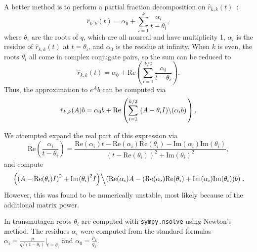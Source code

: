 A better method is to perform a partial fraction decomposition on $\hat{r}_{k,
  k}(t)$~\cite{pusa2010computing}:
\begin{equation}
\label{eq:part-frac}
  \hat{r}_{k, k}(t) = \alpha_0 + \sum_{i=1}^k \frac{\alpha_i}{t - \theta_i},
\end{equation}
where $\theta_i$ are the roots of $q$, which are all
nonreal and have multiplicity 1, $\alpha_i$ is the residue of
$\hat{r}_{k, k}(t)$ at $t=\theta_i$, and $\alpha_0$ is the residue at
infinity. When $k$ is even, the roots $\theta_i$ all come in complex conjugate
pairs, so the sum can be reduced to
\begin{equation}
  \hat{r}_{k, k}(t) = \alpha_0 + \mathrm{Re}\left(\sum_{i=1}^{k/2}
    \frac{\alpha_i}{t - \theta_i}\right).
\end{equation}
Thus, the approximation to $e^Ab$ can be computed via
\begin{equation}
\label{eq:part-frac-matrix-re}
  \hat{r}_{k, k}(A)b = \alpha_0b + \mathrm{Re}\left(\sum_{i=1}^{k/2} \left. (A -
    \theta_i I)\middle\backslash(\alpha_i b) \right.\right).
\end{equation}

We attempted expand the real part of this expression via
\begin{equation}
\mathrm{Re}\left(\frac{\alpha_i}{t - \theta_i}\right) = \frac{\mathrm{Re}{(\alpha_{i})}t - \mathrm{Re}{(\alpha_{i})} \mathrm{Re}{(\theta_{i})} - \mathrm{Im}{(\alpha_{i})} \mathrm{Im}{(\theta_{i})}}{\left(t - \mathrm{Re}{(\theta_{i})}\right)^{2} + \mathrm{Im}{(\theta_{i})}^{2}},
\end{equation}
and compute
\begin{equation}
  \left.\left(\left(A - \mathrm{Re}{(\theta_{i})I}\right)^{2} +
  \mathrm{Im}{(\theta_{i})}^{2}I\right)\middle\backslash \left(\mathrm{Re}{(\alpha_{i})}A - (\mathrm{Re}{(\alpha_{i})} \mathrm{Re}{(\theta_{i})} + \mathrm{Im}{(\alpha_{i})} \mathrm{Im}{(\theta_{i})})b\right)\right..
\end{equation}
However, this was found to be numerically unstable, most likely because of the
additional matrix power. %

In transmutagen roots $\theta_i$ are computed with
\texttt{sympy.\allowbreak{}nsolve} using Newton's method.  The residues
$\alpha_i$ were computed from the standard formulas
$\alpha_i = \frac{p}{q/(t - \theta_i)}|_{t=\theta_i}$ and
$\alpha_0=\frac{p_k}{q_k}$.
